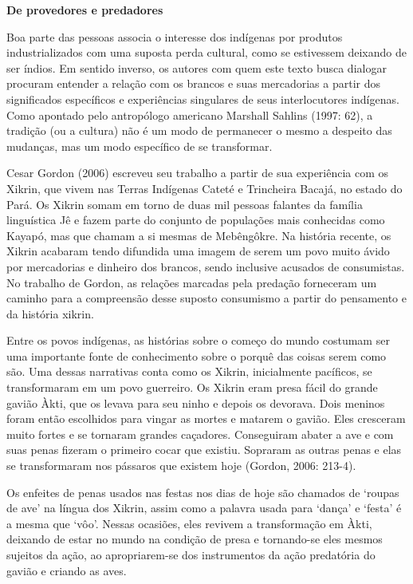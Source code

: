 \textbf{De provedores e predadores }

Boa parte das pessoas associa o interesse dos indígenas por produtos
industrializados com uma suposta perda cultural, como se estivessem
deixando de ser índios. Em sentido inverso, os autores com quem este
texto busca dialogar procuram entender a relação com os brancos e suas
mercadorias a partir dos significados específicos e experiências
singulares de seus interlocutores indígenas. Como apontado pelo
antropólogo americano Marshall Sahlins (1997: 62), a tradição (ou a
cultura) não é um modo de permanecer o mesmo a despeito das mudanças,
mas um modo específico de se transformar.

Cesar Gordon (2006) escreveu seu trabalho a partir de sua experiência
com os Xikrin, que vivem nas Terras Indígenas Cateté e Trincheira
Bacajá, no estado do Pará. Os Xikrin somam em torno de duas mil pessoas
falantes da família linguística Jê e fazem parte do conjunto de
populações mais conhecidas como Kayapó, mas que chamam a si mesmas de
Mebêngôkre. Na história recente, os Xikrin acabaram tendo difundida uma
imagem de serem um povo muito ávido por mercadorias e dinheiro dos
brancos, sendo inclusive acusados de consumistas. No trabalho de Gordon,
as relações marcadas pela predação forneceram um caminho para a
compreensão desse suposto consumismo a partir do pensamento e da
história xikrin.

Entre os povos indígenas, as histórias sobre o começo do mundo costumam
ser uma importante fonte de conhecimento sobre o porquê das coisas serem
como são. Uma dessas narrativas conta como os Xikrin, inicialmente
pacíficos, se transformaram em um povo guerreiro. Os Xikrin eram presa
fácil do grande gavião Àkti, que os levava para seu ninho e depois os
devorava. Dois meninos foram então escolhidos para vingar as mortes e
matarem o gavião. Eles cresceram muito fortes e se tornaram grandes
caçadores. Conseguiram abater a ave e com suas penas fizeram o primeiro
cocar que existiu. Sopraram as outras penas e elas se transformaram nos
pássaros que existem hoje (Gordon, 2006: 213-4).

Os enfeites de penas usados nas festas nos dias de hoje são chamados de
`roupas de ave' na língua dos Xikrin, assim como a palavra usada para
`dança' e `festa' é a mesma que `vôo'. Nessas ocasiões, eles revivem a
transformação em Àkti, deixando de estar no mundo na condição de presa e
tornando-se eles mesmos sujeitos da ação, ao apropriarem-se dos
instrumentos da ação predatória do gavião e criando as aves.

